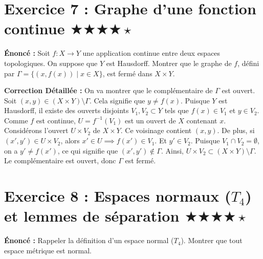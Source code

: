 \documentclass[11pt,a4paper]{article}
\begin{document}
\section{Exercice 7 : Graphe d'une fonction continue \quad $\bigstar\bigstar\bigstar\bigstar\star$}


\textbf{Énoncé :}
Soit $f : X \to Y$ une application continue entre deux espaces topologiques. On suppose que $Y$ est Hausdorff. Montrer que le graphe de $f$, défini par $\Gamma = \{(x, f(x)) \mid x \in X\}$, est fermé dans $X \times Y$.

\textbf{Correction Détaillée :}
On va montrer que le complémentaire de $\Gamma$ est ouvert.
Soit $(x, y) \in (X \times Y) \setminus \Gamma$. Cela signifie que $y \neq f(x)$.
Puisque $Y$ est Hausdorff, il existe des ouverts disjoints $V_1, V_2 \subset Y$ tels que $f(x) \in V_1$ et $y \in V_2$.
Comme $f$ est continue, $U = f^{-1}(V_1)$ est un ouvert de $X$ contenant $x$.
Considérons l'ouvert $U \times V_2$ de $X \times Y$. Ce voisinage contient $(x, y)$.
De plus, si $(x', y') \in U \times V_2$, alors $x' \in U \implies f(x') \in V_1$. Et $y' \in V_2$.
Puisque $V_1 \cap V_2 = \emptyset$, on a $y' \neq f(x')$, ce qui signifie que $(x', y') \notin \Gamma$.
Ainsi, $U \times V_2 \subset (X \times Y) \setminus \Gamma$. Le complémentaire est ouvert, donc $\Gamma$ est fermé.





\section{Exercice 8 : Espaces normaux ($T_4$) et lemmes de séparation \quad $\bigstar\bigstar\bigstar\bigstar\star$}


\textbf{Énoncé :}
Rappeler la définition d'un espace normal ($T_4$). Montrer que tout espace métrique est normal.
\end{document}

